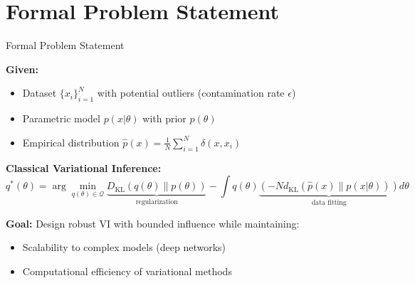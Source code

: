\documentclass[aspectratio=169, 12pt]{beamer}
\begin{document}
\section{Formal Problem Statement}
\begin{frame}{Formal Problem Statement}

\textbf{Given:}
\begin{itemize}
    \item Dataset \(\{x_i\}_{i=1}^N\) with potential outliers (contamination rate \(\epsilon\))
    \item Parametric model \(p(x|\theta)\) with prior \(p(\theta)\)
    \item Empirical distribution \(\hat{p}(x) = \frac{1}{N}\sum_{i=1}^N \delta(x, x_i)\)
\end{itemize}

\vspace{0.3cm}

\textbf{Classical Variational Inference:}
\[
q^*(\theta) = \arg\min_{q(\theta) \in \mathcal{Q}} \underbrace{D_{\text{KL}}(q(\theta) \| p(\theta))}_{\text{regularization}} - \int q(\theta) \underbrace{\left(-N d_{\text{KL}}(\hat{p}(x) \| p(x|\theta))\right)}_{\text{data fitting}} d\theta
\]

\vspace{0.3cm}

\textbf{Goal:} Design robust VI with \alert{bounded influence} while maintaining:
\begin{itemize}
    \item Scalability to complex models (deep networks)
    \item Computational efficiency of variational methods
\end{itemize}

\end{frame}
\end{document}
